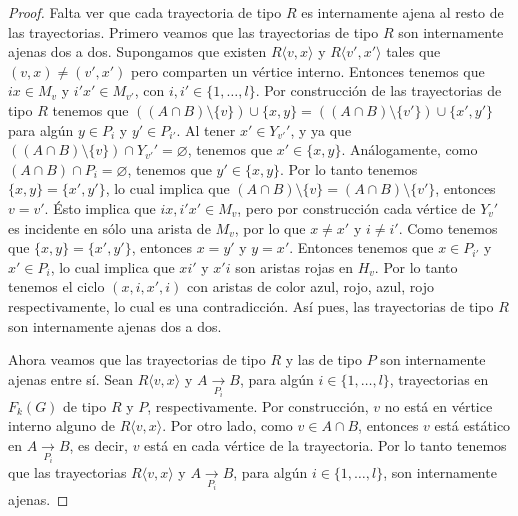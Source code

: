 \begin{proof}
    Falta ver que cada trayectoria de tipo $R$ es internamente ajena al resto de
    las trayectorias. Primero veamos que las trayectorias de tipo $R$ son
    internamente ajenas dos a dos. Supongamos que existen $R \langle v, x
    \rangle$ y $R\langle v',x' \rangle$ tales que $(v,x) \neq (v',x')$ pero
    comparten un v\'ertice interno. Entonces tenemos que $ix \in M_v$ y $i'x'\in
    M_{v'}$, con $i, i' \in \{1, \dots, l\}$. Por construcci\'on de las
    trayectorias de tipo $R$ tenemos que $((A\cap B)\setminus \{v\}) \cup \{x,
    y\} =((A\cap B)\setminus \{v'\}) \cup \{x', y'\}$ para alg\'un $y \in P_i$ y
    $y' \in P_{i'}$. Al tener $x'\in Y_{v'} '$, y ya que $((A \cap B )\setminus
    \{v\}) \cap Y_{v'}'= \varnothing$, tenemos que $x' \in \{x,y\}$.
    An\'alogamente, como $(A \cap B) \cap P_i = \varnothing$, tenemos que $y'\in
    \{x, y\}$. Por lo tanto tenemos $\{x,y\}= \{x',y'\}$, lo cual implica que
    $(A\cap B)\setminus \{v\} = (A\cap B)\setminus \{v'\}$, entonces $v = v'$.
    \'Esto implica que $ix, i'x' \in M_v$, pero por construcci\'on cada
    v\'ertice de $Y_v '$ es incidente en s\'olo una arista de $M_v$, por lo que
    $x \neq x'$ y $i \neq i'$. Como tenemos que $\{x, y\}=\{x', y'\}$, entonces
    $x=y'$ y $y=x'$. Entonces tenemos que $x \in P_{i'}$ y $x'\in P_i$, lo cual
    implica que $xi'$ y $x'i$ son aristas rojas en $H_v$. Por lo tanto tenemos
    el ciclo $(x, i, x', i)$ con aristas de color azul, rojo, azul, rojo
    respectivamente, lo cual es una contradicci\'on. As\'i pues, las
    trayectorias de tipo $R$ son internamente ajenas dos a dos.

    Ahora veamos que las trayectorias de tipo $R$ y las de tipo $P$ son
    internamente ajenas entre s\'i. Sean $R\langle v,x \rangle$ y $A
    \xrightarrow[P_i]{}  B$, para alg\'un $i \in \{1, \dots, l\}$, trayectorias
    en $F_k(G)$ de tipo $R$ y $P$, respectivamente. Por construcci\'on, $v$ no
    est\'a en v\'ertice interno alguno de $R \langle v,x \rangle$. Por otro
    lado, como $ v \in A\cap B$, entonces $v$ est\'a est\'atico en $A
    \xrightarrow[P_i]{}  B$, es decir, $v$ est\'a en cada v\'ertice de la
    trayectoria. Por lo tanto tenemos que las trayectorias $R\langle v,x
    \rangle$ y $A \xrightarrow[P_i]{}  B$, para alg\'un $i \in \{1, \dots, l\}$,
    son internamente ajenas.


\end{proof}
